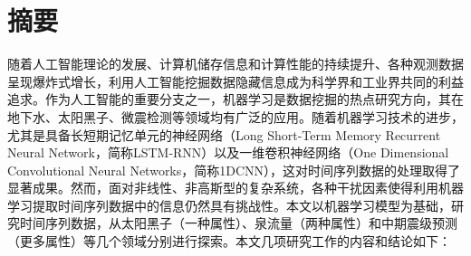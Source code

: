 \setlength{\headheight}{26pt}
\maketitle %
\MAKETITLE %
\makedeclaration %

\intobmk\chapter*{\texorpdfstring{摘\quad 要}{摘要}}
\setcounter{page}{1}
随着人工智能理论的发展、计算机储存信息和计算性能的持续提升、各种观测数据呈现爆炸式增长，利用人工智能挖掘数据隐藏信息成为科学界和工业界共同的利益追求。作为人工智能的重要分支之一，机器学习是数据挖掘的热点研究方向，其在地下水、太阳黑子、微震检测等领域均有广泛的应用。随着机器学习技术的进步，尤其是具备长短期记忆单元的神经网络（Long Short-Term Memory Recurrent Neural Network，简称LSTM-RNN）以及一维卷积神经网络（One Dimensional Convolutional Neural Networks，简称1DCNN），这对时间序列数据的处理取得了显著成果。然而，面对非线性、非高斯型的复杂系统，各种干扰因素使得利用机器学习提取时间序列数据中的信息仍然具有挑战性。本文以机器学习模型为基础，研究时间序列数据，从太阳黑子（一种属性）、泉流量（两种属性）和中期震级预测（更多属性）等几个领域分别进行探索。本文几项研究工作的内容和结论如下：
